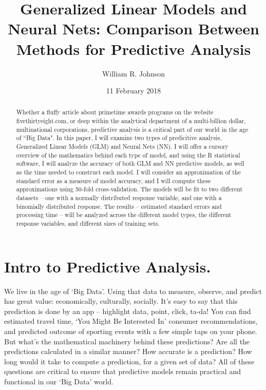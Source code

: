 \documentclass[12pt]{article}
\begin{document}
	\title{Generalized Linear Models and Neural Nets: Comparison Between Methods for Predictive Analysis}
	\author{William R. Johnson}
	\date{11 February 2018}
	\maketitle

	\renewcommand{\abstractname}{Abstract:}
	\begin{abstract}
		Whether a fluffy article about primetime awards programs on the website fivethirtyeight.com, or deep within the analytical 
department of a multi-billion dollar, multinational corporations, predictive analysis is a critical part of our world in the age of ``Big Data".  
In this paper, I will examine two types of predicitive analysis, Generalized Linear Models (GLM) and Neural Nets (NN).  I will offer a cursory 
overview of the mathematics behind each type of model, and using the R statistical software, I will analyze the accuracy of both GLM and NN 
predictive models, as well as the time needed to construct each model. I will consider an approximation of the standard error as a measure of model 
accuracy, and I will compute these approximations using 50-fold cross-validation.  The models will be fit to two different datasets -- one with a 
normally distributed response variable, and one with a binomially distributed response.  The results -- estimated standard errors and processing 
time -- will be analyzed across the different model types, the different response variables, and different sizes of training sets.
	\end{abstract}
	\vfill\eject





	\section{Intro to Predictive Analysis.}
		We live in the age of `Big Data'.  Using that data to measure, observe, and predict has great value:  economically, culturally, 
socially.  It's easy to say that this prediction is done by an app -- highlight data, point, click, ta-da!  You can find estimated travel time, 
`You Might Be Interested In' consumer recommendations, and predicted outcome of sporting events with a few simple taps on your phone.  But what's 
the mathematical machinery behind these predictions?  Are all the predictions calculated in a similar manner?  How accurate is a prediction?  How
long would it take to compute a prediction, for a given set of data?  All of these questions are critical to ensure that predictive models remain
practical and functional in our `Big Data' world.
\end{document}

